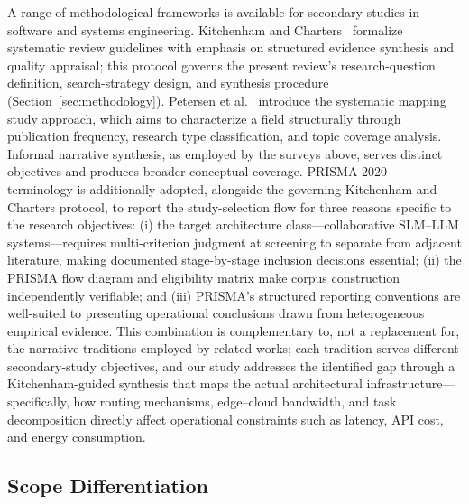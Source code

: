 A range of methodological frameworks is available for secondary studies in software and systems engineering. Kitchenham and Charters~\cite{kitchenham2007guidelines} formalize systematic review guidelines with emphasis on structured evidence synthesis and quality appraisal; this protocol governs the present review's research-question definition, search-strategy design, and synthesis procedure (Section~\ref{sec:methodology}). Petersen et al.~\cite{petersen2008systematic} introduce the systematic mapping study approach, which aims to characterize a field structurally through publication frequency, research type classification, and topic coverage analysis. Informal narrative synthesis, as employed by the surveys above, serves distinct objectives and produces broader conceptual coverage. PRISMA 2020~\cite{page2021prisma} terminology is additionally adopted, alongside the governing Kitchenham and Charters protocol, to report the study-selection flow for three reasons specific to the research objectives: (i) the target architecture class---collaborative SLM--LLM systems---requires multi-criterion judgment at screening to separate from adjacent literature, making documented stage-by-stage inclusion decisions essential; (ii) the PRISMA flow diagram and eligibility matrix make corpus construction independently verifiable; and (iii) PRISMA's structured reporting conventions are well-suited to presenting operational conclusions drawn from heterogeneous empirical evidence. This combination is complementary to, not a replacement for, the narrative traditions employed by related works; each tradition serves different secondary-study objectives, and our study addresses the identified gap through a Kitchenham-guided synthesis that maps the actual architectural infrastructure---specifically, how routing mechanisms, edge--cloud bandwidth, and task decomposition directly affect operational constraints such as latency, API cost, and energy consumption.

\subsection{Scope Differentiation}

